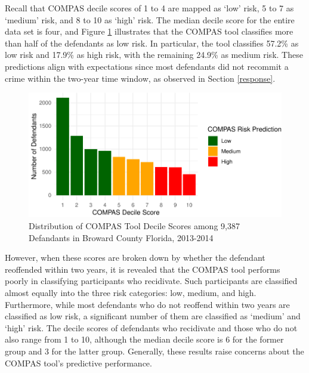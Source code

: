 \documentclass[12pt, twoside]{amherstthesis}
\begin{document}
Recall that COMPAS decile scores of 1 to 4 are mapped as `low' risk, 5 to 7 as `medium' risk, and 8 to 10 as `high' risk. The median decile score for the entire data set is four, and Figure \ref{fig:ch3fig8} illustrates that the COMPAS tool classifies more than half of the defendants as low risk. In particular, the tool classifies 57.2\% as low risk and 17.9\% as high risk, with the remaining 24.9\% as medium risk. These predictions align with expectations since most defendants did not recommit a crime within the two-year time window, as observed in Section \ref{response}.
\begin{figure}

{\centering \includegraphics{Dasha-Asienga_StatThesis_files/figure-latex/ch3fig8-1} 

}

\caption{Distribution of COMPAS Tool Decile Scores among 9,387 Defandants in Broward County Florida, 2013-2014}\label{fig:ch3fig8}
\end{figure}
However, when these scores are broken down by whether the defendant reoffended within two years, it is revealed that the COMPAS tool performs poorly in classifying participants who recidivate. Such participants are classified almost equally into the three risk categories: low, medium, and high. Furthermore, while most defendants who do not reoffend within two years are classified as low risk, a significant number of them are classified as `medium' and `high' risk. The decile scores of defendants who recidivate and those who do not also range from 1 to 10, although the median decile score is 6 for the former group and 3 for the latter group. Generally, these results raise concerns about the COMPAS tool's predictive performance.
\end{document}
